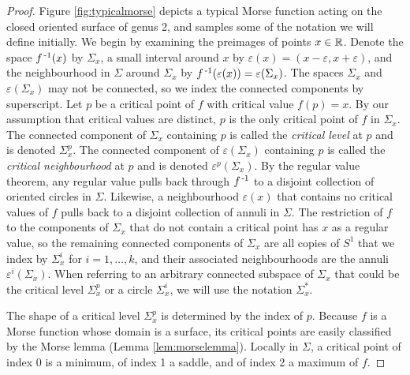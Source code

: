 \begin{proof}
	Figure \ref{fig:typicalmorse} depicts a typical Morse function acting on the closed oriented surface of genus 2, and samples some of the notation we will define initially.
	We begin by examining the preimages of points $x\in\mathbb{R}$.
	Denote the space $f^{\,\text{-}1}(x)$ by $\Sigma_x$, a small interval around $x$ by $\varepsilon(x)=(x-\varepsilon,x+\varepsilon)$, and the neighbourhood in $\Sigma$ around $\Sigma_x$ by $f^{\,\text{-}1}(\varepsilon(x))=\varepsilon(\Sigma_x)$.
	The spaces $\Sigma_x$ and $\varepsilon(\Sigma_x)$ may not be connected, so we index the connected components by superscript.
	Let $p$ be a critical point of $f$ with critical value $f(p)=x$.
	By our assumption that critical values are distinct, $p$ is the only critical point of $f$ in $\Sigma_x$.
	The connected component of $\Sigma_x$ containing $p$ is called the \emph{critical level} at $p$ and is denoted $\Sigma_x^p$.
	The connected component of $\varepsilon(\Sigma_x)$ containing $p$ is called the \emph{critical neighbourhood} at $p$ and is denoted $\varepsilon^p(\Sigma_x)$.
	By the regular value theorem, any regular value pulls back through $f^{\,\text{-}1}$ to a disjoint collection of oriented circles in $\Sigma$.
	Likewise, a neighbourhood $\varepsilon(x)$ that contains no critical values of $f$ pulls back to a disjoint collection of annuli in $\Sigma$.
	The restriction of $f$ to the components of $\Sigma_x$ that do not contain a critical point has $x$ as a regular value, so the remaining connected components of $\Sigma_x$ are all copies of $S^1$ that we index by $\Sigma_x^i$ for $i=1,\dots,k$, and their associated neighbourhoods are the annuli $\varepsilon^i(\Sigma_x)$.
	When referring to an arbitrary connected subspace of $\Sigma_x$ that could be the critical level $\Sigma_x^p$ or a circle $\Sigma_x^i$, we will use the notation $\Sigma_x^*$.
	
	The shape of a critical level $\Sigma_x^p$ is determined by the index of $p$.
	Because $f$ is a Morse function whose domain is a surface, its critical points are easily classified by the Morse lemma (Lemma \ref{lem:morselemma}).
	Locally in $\Sigma$, a critical point of index 0 is a minimum, of index 1 a saddle, and of index 2 a maximum of $f$.
	

\end{proof}
